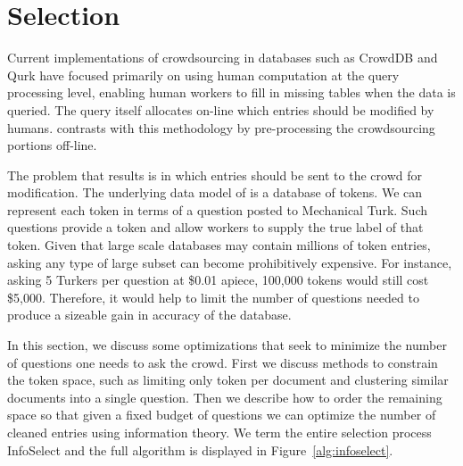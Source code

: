 \section{Selection}
\label{sec:selection}

Current implementations of crowdsourcing in databases such as CrowdDB \cite{DBLP:conf/sigmod/FranklinKKRX11} and Qurk \cite{DBLP:conf/sigmod/MarcusWKMM11} have focused primarily on using human computation at the query processing level, enabling human workers to fill in missing tables when the data is queried.  The query itself allocates on-line which entries should be modified by humans.  \sysName contrasts with this methodology by pre-processing the crowdsourcing portions off-line.

The problem that results is in which entries should be sent to the crowd for modification.  The underlying data model of \sysName is a database of tokens.  We can represent each token in terms of a question posted to Mechanical Turk.  Such questions provide a token and allow workers to supply the true label of that token.  Given that large scale databases may contain millions of token entries, asking any type of large subset can become prohibitively expensive.  For instance, asking 5 Turkers per question at \$0.01 apiece, 100,000 tokens would still cost \$5,000. Therefore, it would help to limit the number of questions needed to produce a sizeable gain in accuracy of the database.

In this section, we discuss some optimizations that seek to minimize the number of questions one needs to ask the crowd.  First we discuss methods to constrain the token space, such as limiting only token per document and clustering similar documents into a single question.  Then we describe how to order the remaining space so that given a fixed budget of questions we can optimize the number of cleaned entries using information theory.  We term the entire selection process InfoSelect and the full algorithm is displayed in Figure~\ref{alg:infoselect}. 

